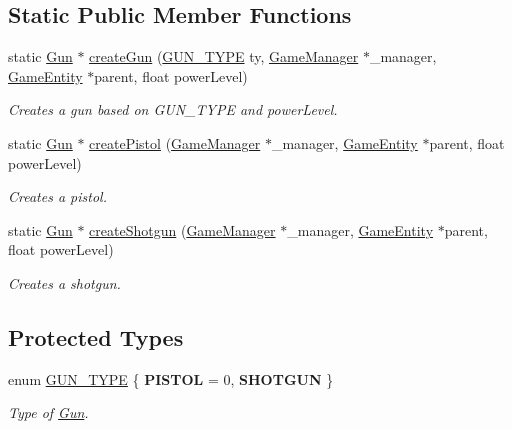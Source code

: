 \subsection*{Static Public Member Functions}
\begin{DoxyCompactItemize}
\item 
static \mbox{\hyperlink{class_gun}{Gun}} $\ast$ \mbox{\hyperlink{class_gun_a14269170e2da53ea0391cb6fec21ae86}{create\+Gun}} (\mbox{\hyperlink{class_gun_aaeeca616af10d56012d8a77b565ccccd}{G\+U\+N\+\_\+\+T\+Y\+PE}} ty, \mbox{\hyperlink{class_game_manager}{Game\+Manager}} $\ast$\+\_\+manager, \mbox{\hyperlink{class_game_entity}{Game\+Entity}} $\ast$parent, float power\+Level)
\begin{DoxyCompactList}\small\item\em Creates a gun based on G\+U\+N\+\_\+\+T\+Y\+PE and power\+Level. \end{DoxyCompactList}\item 
static \mbox{\hyperlink{class_gun}{Gun}} $\ast$ \mbox{\hyperlink{class_gun_a8463d14ddc042099c306f1ae25e42abb}{create\+Pistol}} (\mbox{\hyperlink{class_game_manager}{Game\+Manager}} $\ast$\+\_\+manager, \mbox{\hyperlink{class_game_entity}{Game\+Entity}} $\ast$parent, float power\+Level)
\begin{DoxyCompactList}\small\item\em Creates a pistol. \end{DoxyCompactList}\item 
static \mbox{\hyperlink{class_gun}{Gun}} $\ast$ \mbox{\hyperlink{class_gun_a75188b702cff75b55d03c565be7a386e}{create\+Shotgun}} (\mbox{\hyperlink{class_game_manager}{Game\+Manager}} $\ast$\+\_\+manager, \mbox{\hyperlink{class_game_entity}{Game\+Entity}} $\ast$parent, float power\+Level)
\begin{DoxyCompactList}\small\item\em Creates a shotgun. \end{DoxyCompactList}\end{DoxyCompactItemize}
\subsection*{Protected Types}
\begin{DoxyCompactItemize}
\item 
\mbox{\label{class_gun_aaeeca616af10d56012d8a77b565ccccd}} 
enum \mbox{\hyperlink{class_gun_aaeeca616af10d56012d8a77b565ccccd}{G\+U\+N\+\_\+\+T\+Y\+PE}} \{ {\bfseries P\+I\+S\+T\+OL} = 0, 
{\bfseries S\+H\+O\+T\+G\+UN}
 \}
\begin{DoxyCompactList}\small\item\em Type of \mbox{\hyperlink{class_gun}{Gun}}. \end{DoxyCompactList}\end{DoxyCompactItemize}

